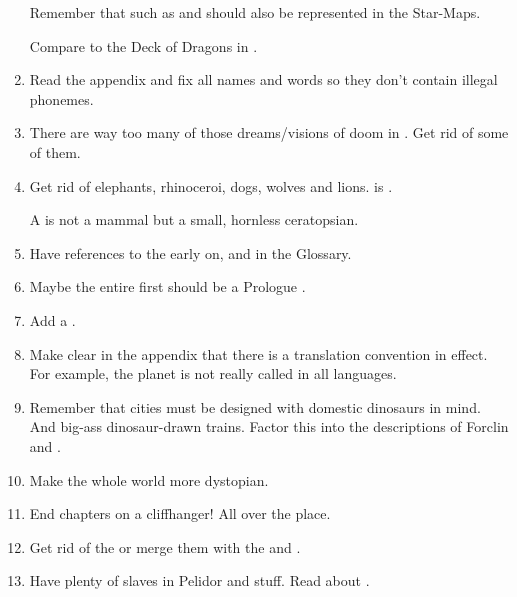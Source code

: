 \begin{enumerate}
    Remember that \nexi{} such as \Malcur and \Nithdornazsh{} should also be represented in the Star-Maps. 
    
    Compare to the Deck of Dragons in \cite{StevenEriksonIanCameronEsslemont:MalazanBookoftheFallen}. 
  
  \item 
    Read the  appendix and fix all names and words so they don't contain illegal phonemes. 
  
  \item 
    There are way too many of those dreams/visions of doom in \Malcur.
    Get rid of some of them. 
  
  \item 
    Get rid of elephants, rhinoceroi, dogs, wolves and lions. 
    \Miith{} is . 
  
    A \belwan{} is not a mammal but a small, hornless ceratopsian. 
    
  \item 
    Have references to the  early on, and in the Glossary. 
  
  \item 
    Maybe the entire first  should be a Prologue . 
  
  \item 
    Add a . 
  
  \item 
    Make clear in the appendix that there is a translation convention in effect.
    For example, the planet is not really called \quo{\Miith} in all languages.
  
  \item 
    Remember that cities must be designed with domestic dinosaurs in mind.
    And big-ass dinosaur-drawn trains. 
    Factor this into the descriptions of Forclin and \Malcur.

  \item 
    Make the whole world more dystopian.

  \item 
    End chapters on a cliffhanger! 
    All over the place.

  \item 
    Get rid of the  or merge them with the \noggyaleth and \xss.
  
  \item 
    Have plenty of  slaves in Pelidor and stuff. 
    Read about .
  

\end{enumerate}
